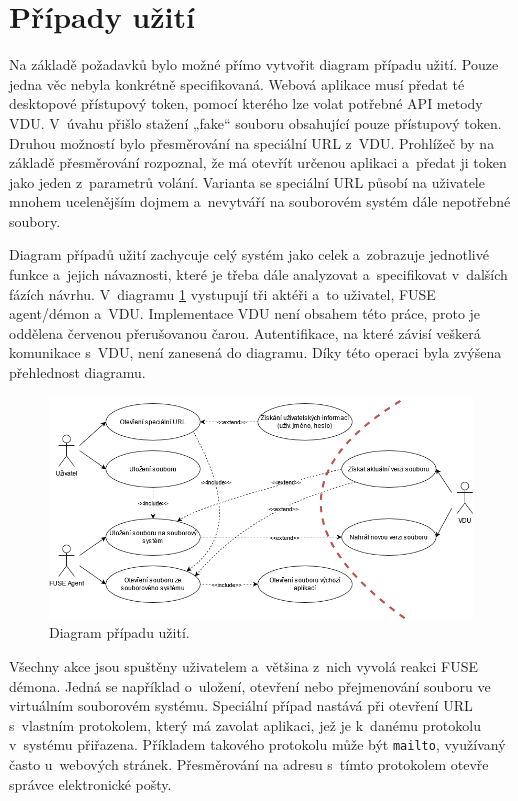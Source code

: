 \section{Případy užití}

Na základě požadavků bylo možné přímo vytvořit diagram případu užití. Pouze jedna věc nebyla konkrétně specifikovaná. Webová aplikace musí předat té desktopové 
přístupový token, pomocí kterého lze volat potřebné API metody VDU. V úvahu přišlo stažení „fake“ souboru obsahující pouze přístupový token. Druhou možností bylo
přesměrování na speciální URL z VDU. Prohlížeč by na základě přesměrování rozpoznal, že má otevřít určenou aplikaci a předat ji token jako jeden z parametrů
volání. Varianta se speciální URL působí na uživatele mnohem ucelenějším dojmem a nevytváří na souborovém systém dále nepotřebné soubory.

Diagram případů užití zachycuje celý systém jako celek a zobrazuje jednotlivé funkce a jejich návaznosti, které je třeba dále analyzovat a specifikovat v dalších
fázích návrhu. V diagramu \ref{fig:use_case} vystupují tři aktéři a to uživatel, FUSE agent/démon a VDU. Implementace VDU není obsahem této práce, proto je oddělena červenou
přerušovanou čarou. Autentifikace, na které závisí veškerá komunikace s VDU, není zanesená do diagramu. Díky této operaci byla zvýšena přehlednost diagramu.

\begin{figure}[h]
    \centering    
    \includegraphics[width=1\linewidth]{other-fig/use_case_diagram.png}
    \caption{Diagram případu užití.}
    \label{fig:use_case}
\end{figure}


Všechny akce jsou spuštěny uživatelem a většina z nich vyvolá reakci FUSE démona. Jedná se například o uložení, otevření nebo přejmenování souboru ve virtuálním souborovém
systému. Speciální případ nastává při otevření URL s vlastním protokolem, který má zavolat aplikaci, jež je k danému protokolu v systému přiřazena. Příkladem takového
protokolu může být \texttt{mailto}, využívaný často u webových stránek. Přesměrování na adresu s tímto protokolem otevře správce elektronické pošty. 

